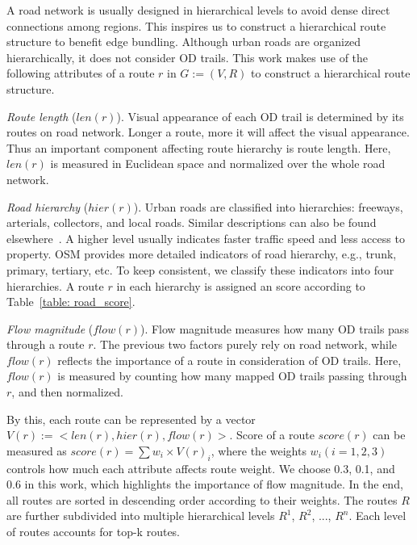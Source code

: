 A road network is usually designed in hierarchical levels to avoid dense direct connections among regions.
This inspires us to construct a hierarchical route structure to benefit edge bundling.
Although urban roads are organized hierarchically, it does not consider OD trails.
This work makes use of the following attributes of a route $r$ in $G := (V, R)$ to construct a hierarchical route structure.

\vspace{1mm}
\noindent
\textit{Route length} ($len(r)$).
Visual appearance of each OD trail is determined by its routes on road network.
Longer a route, more it will affect the visual appearance.
Thus an important component affecting route hierarchy is route length.
Here, $len(r)$ is measured in Euclidean space and normalized over the whole road network.

\vspace{1mm}
\noindent
\textit{Road hierarchy} ($hier(r)$).
Urban roads are classified into hierarchies: freeways, arterials, collectors, and local roads.
Similar descriptions can also be found elsewhere~\cite{wang_2014_visual-reasoning}.
A higher level usually indicates faster traffic speed and less access to property.
OSM provides more detailed indicators of road hierarchy, e.g., trunk, primary, tertiary, etc.
To keep consistent, we classify these indicators into four hierarchies.
A route $r$ in each hierarchy is assigned an score according to Table~\ref{table: road_score}. 

\vspace{1mm}
\noindent
\textit{Flow magnitude} ($flow(r)$).
Flow magnitude measures how many OD trails pass through a route $r$.
The previous two factors purely rely on road network, while $flow(r)$ reflects the importance of a route in consideration of OD trails.
Here, $flow(r)$ is measured by counting how many mapped OD trails passing through $r$, and then normalized. 

\vspace{2mm}
By this, each route can be represented by a vector $V(r) := <len(r), hier(r), flow(r)>$.
Score of a route $score(r)$ can be measured as $score(r) = \sum w_i \times V(r)_i$, where the weights $w_i (i = 1, 2, 3)$ controls how much each attribute affects route weight.
We choose 0.3, 0.1, and 0.6 in this work, which highlights the importance of flow magnitude.
In the end, all routes are sorted in descending order according to their weights.
The routes $R$ are further subdivided into multiple hierarchical levels $R^1$, $R^2$, ..., $R^n$.
Each level of routes accounts for top-k routes.

